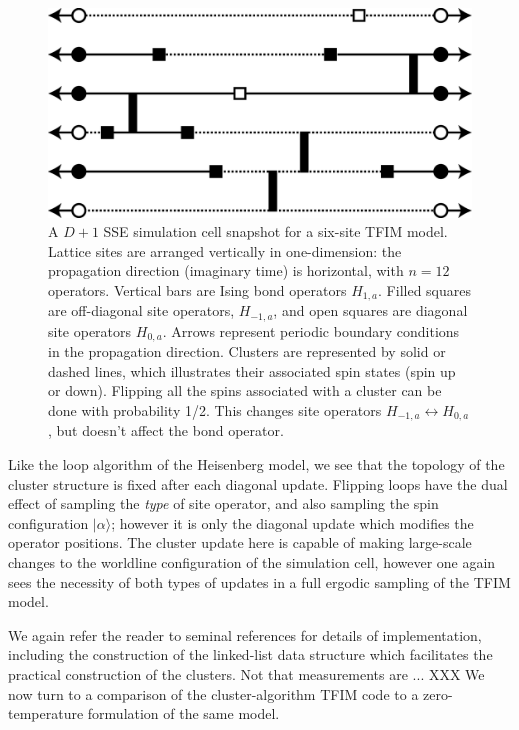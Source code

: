 \documentclass[vecphys]{svmult}
\begin{document}
\begin{figure}[t]
\centering
\includegraphics*[width=.9\textwidth]{finiteT_tfim.eps}
\caption[]{A $D+1$ SSE simulation cell snapshot for a six-site TFIM model.  Lattice sites are arranged vertically in one-dimension: the propagation direction (imaginary time) is horizontal, with $n=12$ operators.  
Vertical bars are Ising bond operators $H_{1,a}$.  Filled squares are off-diagonal site operators, $H_{-1,a}$, and open squares are diagonal site operators $H_{0,a}$.
Arrows represent periodic boundary conditions in the propagation direction.  
Clusters are represented by solid or dashed lines, which illustrates their associated spin states (spin up or down).  Flipping all the spins associated with a cluster can be done with probability 1/2.  This changes site operators $H_{-1,a} \leftrightarrow H_{0,a}$, but doesn't affect the bond operator.}
\label{fig:4}      
\end{figure} 

Like the loop algorithm of the Heisenberg model, we see that the topology of the cluster structure is fixed after each diagonal update.  Flipping loops have the dual effect of sampling the {\em type} of site operator, and also sampling the spin configuration $|\alpha \rangle$; however it is only the diagonal update which modifies the operator positions.  
The cluster update here is capable of making large-scale changes to the worldline configuration of the simulation cell, however one again sees the necessity of both types of updates in a full ergodic sampling of the TFIM model.

We again refer the reader to seminal references for details of implementation, including the construction of the linked-list data structure which facilitates the practical construction of the clusters.  Not that measurements are ... XXX
We now turn to a comparison of the cluster-algorithm TFIM code to a zero-temperature formulation of the same model.
\end{document}
